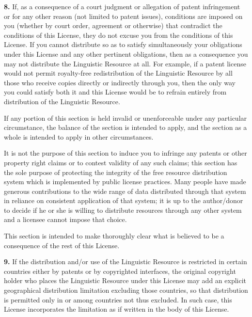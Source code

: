 \documentclass[10pt]{article}
\begin{document}
\vspace{5pt}\noindent
{\bf 8.} If, as a consequence of a 
      court judgment or allegation of patent infringement or for any other 
      reason (not limited to patent issues), conditions are imposed on you 
      (whether by court order, agreement or otherwise) that contradict the 
      conditions of this License, they do not excuse you from the conditions of 
      this License. If you cannot distribute so as to satisfy simultaneously 
      your obligations under this License and any other pertinent obligations, 
      then as a consequence you may not distribute the Linguistic Resource at 
      all. For example, if a patent license would not permit royalty-free 
      redistribution of the Linguistic Resource by all those who receive copies 
      directly or indirectly through you, then the only way you could satisfy 
      both it and this License would be to refrain entirely from distribution of 
      the Linguistic Resource. 

\vspace{5pt}\noindent
If any 
      portion of this section is held invalid or unenforceable under any 
      particular circumstance, the balance of the section is intended to apply, 
      and the section as a whole is intended to apply in other circumstances. 

\vspace{5pt}\noindent
It is not 
      the purpose of this section to induce you to infringe any patents or other 
      property right claims or to contest validity of any such claims; this 
      section has the sole purpose of protecting the integrity of the free 
      resource distribution system which is implemented by public license 
      practices. Many people have made generous contributions to the wide range 
      of data distributed through that system in reliance on consistent 
      application of that system; it is up to the author/donor to decide if he 
      or she is willing to distribute resources through any other system and a 
      licensee cannot impose that choice. 

\vspace{5pt}\noindent
This 
      section is intended to make thoroughly clear what is believed to be a 
      consequence of the rest of this License. 

\vspace{5pt}\noindent
{\bf 9.} If the distribution and/or 
      use of the Linguistic Resource is restricted in certain countries either 
      by patents or by copyrighted interfaces, the original copyright holder who 
      places the Linguistic Resource under this License may add an explicit 
      geographical distribution limitation excluding those countries, so that 
      distribution is permitted only in or among countries not thus excluded. In 
      such case, this License incorporates the limitation as if written in the 
      body of this License. 
\end{document}
